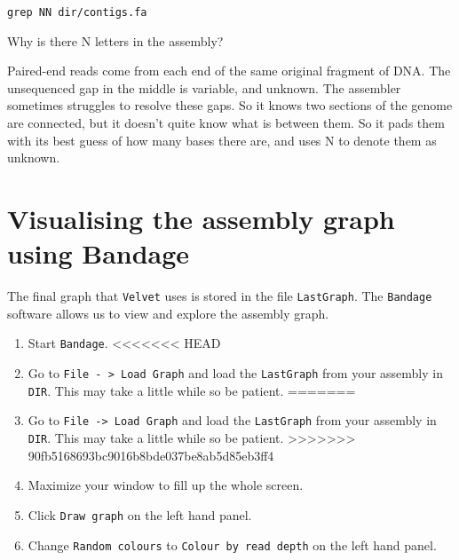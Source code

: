 \begin{steps}
\begin{lstlisting}
grep NN dir/contigs.fa
\end{lstlisting}
\end{steps}

\begin{questions}
Why is there N letters in the assembly? \\
\begin{answer}
Paired-end reads come from each end of the same original fragment of DNA.
The unsequenced gap in the middle is variable, and unknown. The assembler
sometimes struggles to resolve these gaps. So it knows two sections of the
genome are connected, but it doesn't quite know what is between them. So
it pads them with its best guess of how many bases there are, and uses N
to denote them as unknown.
\end{answer}
\end{questions}

\section{Visualising the assembly graph using Bandage}

The final graph that \texttt{Velvet} uses is stored in the file \texttt{LastGraph}.
The \texttt{Bandage} software allows us to view and explore the assembly graph.
\begin{steps}
\begin{enumerate}
\item Start \texttt{Bandage}.
<<<<<<< HEAD
\item Go to \texttt{File - > Load Graph} and load the \texttt{LastGraph} from your assembly in \texttt{DIR}. This may take a little while so be patient.
=======
\item Go to \texttt{File -> Load Graph} and load the \texttt{LastGraph} from your assembly in \texttt{DIR}. This may take a little while so be patient.
>>>>>>> 90fb5168693bc9016b8bde037be8ab5d85eb3ff4
\item Maximize your window to fill up the whole screen.
\item Click \texttt{Draw graph} on the left hand panel.
\item Change \texttt{Random colours} to \texttt{Colour by read depth} on the left hand panel.
\end{enumerate}
\end{steps}

